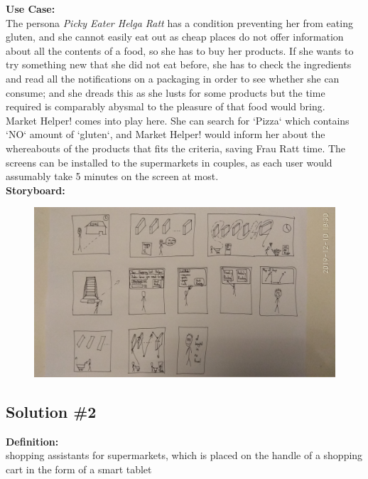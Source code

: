 \documentclass[a4paper,10pt,oneside]{scrreprt}
\begin{document}
			\noindent \textbf{Use Case:}\\
			\indent The persona \textit{Picky Eater Helga Ratt} has a condition preventing her from eating gluten, and she cannot easily eat out as cheap places do not offer information about all the contents of a food, so she has to buy her products. If she wants to try something new that she did not eat before, she has to check the ingredients and read all the notifications on a packaging in order to see whether she can consume; and she dreads this as she lusts for some products but the time required is comparably abysmal to the pleasure of that food would bring.\\
			
			Market Helper! comes into play here. She can search for `Pizza` which contains `NO` amount of `gluten`, and Market Helper! would inform her about the whereabouts of the products that fits the criteria, saving Frau Ratt time. The screens can be installed to the supermarkets in couples, as each user would assumably take 5 minutes on the screen at most.\\
		
			\noindent \textbf{Storyboard:}\\
			
			\begin{figure}[H]
				\centering
				\includegraphics[scale=0.16, clip, trim={45em 0em 45em 0em}]{images/s1.jpg}
			\end{figure}
			
		\clearpage
		\subsection{Solution \#2}
		
			\noindent \textbf{Definition:}\\
			shopping assistants for supermarkets, which is placed on the handle of a shopping cart in the form of a smart tablet\\
			
\end{document}
